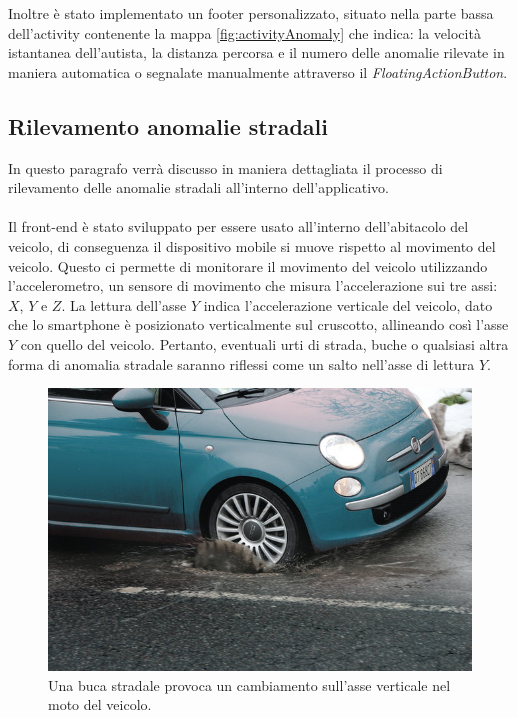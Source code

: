\documentclass[a4paper, 11pt]{article} %
\begin{document}
Inoltre è stato implementato un footer personalizzato, situato nella parte bassa dell'activity contenente la mappa \ref{fig:activityAnomaly} che indica: la velocità istantanea dell'autista, la distanza percorsa e il numero delle anomalie rilevate in maniera automatica o segnalate manualmente attraverso il \textit{FloatingActionButton}.

\subsection*{Rilevamento anomalie stradali \cite{Mohamed2016}}

In questo paragrafo verrà discusso in maniera dettagliata il processo di rilevamento delle anomalie stradali all'interno dell'applicativo.\\\\
Il front-end è stato sviluppato per essere usato all'interno dell'abitacolo del veicolo, di conseguenza il dispositivo mobile si muove rispetto al movimento del veicolo. 
Questo ci permette di monitorare il movimento del veicolo utilizzando l'accelerometro, un sensore di movimento che misura l'accelerazione sui tre assi: $X$, $Y$ e $Z$. La lettura dell'asse $Y$ indica l'accelerazione verticale del veicolo, dato che
lo smartphone è posizionato verticalmente sul cruscotto, allineando così l'asse $Y$ con quello del veicolo. Pertanto, eventuali urti di strada, buche o qualsiasi altra forma di anomalia stradale saranno riflessi come un salto nell'asse di lettura $Y$. 
\begin{figure}[h]
	\begin{center}
		\includegraphics[width=\textwidth]{images/pothole.jpg}
	\end{center}
	\caption{Una buca stradale provoca un cambiamento sull'asse verticale nel moto del veicolo.}
	\label{fig:pothole}
\end{figure}
\end{document}
